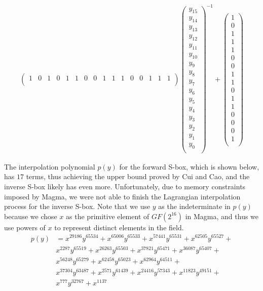 \begin{align*}
\begin{pmatrix}
1 & 0 & 1 & 0 & 1 & 1 & 0 & 0 & 1 & 1 & 1 & 0 & 0 & 1 & 1 & 1 \\ 
\end{pmatrix}
\begin{pmatrix}
y_{15} \\
y_{14} \\
y_{13} \\
y_{12} \\
y_{11} \\
y_{10} \\
y_{9} \\
y_{8} \\
y_{7} \\
y_{6} \\
y_{5} \\
y_{4} \\
y_{3} \\
y_{2} \\
y_{1} \\
y_{0} \\
\end{pmatrix}^{-1}
+
\begin{pmatrix}
1 \\
0 \\
1 \\
1 \\
1 \\
0 \\
0 \\
1 \\
1 \\
0 \\
1 \\
1 \\
0 \\
0 \\
0 \\
1 \\
\end{pmatrix}
\end{align*}

The interpolation polynomial $p(y)$ for the forward S-box, which is shown below, has $17$ terms, thus achieving the upper bound proved by Cui and Cao, and the inverse S-box likely has even more. Unfortunately, due to memory constraints imposed by Magma, we were not able to finish the Lagrangian interpolation process for the inverse S-box. Note that we use $y$ as the indeterminate in $p(y)$ because we chose $x$ as the primitive element of $GF(2^{16})$ in Magma, and thus we use powers of $x$ to represent distinct elements in the field.
\begin{align*} \label{eqn:interpPoly}
p(y) & = x^{29186}y^{65534} + x^{65006}y^{65533} + x^{57441}y^{65531} + x^{62505}y^{65527} + \\
    & x^{2287}y^{65519} + x^{26263}y^{65503} + x^{37821}y^{65471} + x^{36087}y^{65407} + \\
    & x^{56248}y^{65279} + x^{62458}y^{65023} + x^{62964}y^{64511} + \\
    & x^{37304}y^{63487} + x^{2571}y^{61439} + x^{24416}y^{57343} + x^{11823}y^{49151} + \\
    & x^{777}y^{32767} + x^{1137}
\end{align*}

